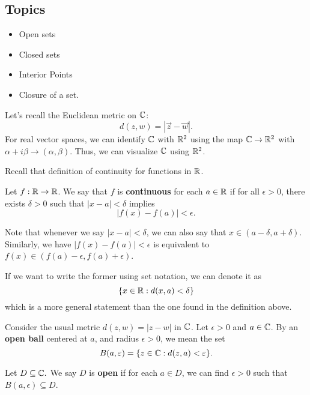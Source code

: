 \documentclass[a4paper]{report}
\begin{document}
    
\rhead{\thepage}
\subsection{Topics}

\begin{itemize}
    \item Open sets
    \item Closed sets
    \item Interior Points
    \item Closure of a set.
\end{itemize}

Let's recall the Euclidean metric on \( \mathbb{C}  \):
\[  d(z,w) = | \vec{ z }  - \vec{ w }   |.  \]
For real vector spaces, we can identify \( \mathbb{C}  \) with \( \mathbb{R}^{2} \) using the map \( \mathbb{C} \to \mathbb{R}^{2}  \) with \( \alpha + i \beta \to (\alpha, \beta) \). Thus, we can visualize \( \mathbb{C}  \) using \( \mathbb{R}^{2} \).

Recall that definition of continuity for functions in \( \R  \).

\begin{definition}[continuity in \( \R  \)]
    Let \( f: \mathbb{R} \to \mathbb{R}  \). We say that \( f  \) is \textbf{continuous} for each \( a \in \mathbb{R}  \) if for all \( \epsilon > 0 \), there exists \( \delta > 0  \) such that \( | x - a  |  < \delta \) implies
    \[  | f(x) - f(a) |  < \epsilon. \]
\end{definition}

Note that whenever we say \( | x - a  |  < \delta  \), we can also say that \( x \in (a - \delta, a + \delta) \). Similarly, we have \( | f(x) - f(a) | < \epsilon  \) is equivalent to \( f(x) \in (f(a) - \epsilon, f(a) + \epsilon) \).

If we want to write the former using set notation, we can denote it as 
\[  \{ x \in \mathbb{R} : d(x,a) < \delta \}  \]
which is a more general statement than the one found in the definition above.
\begin{definition}
  Consider the usual metric \( d(z,w) = | z - w  |   \) in \( \mathbb{C}  \). Let \( \epsilon > 0  \) and \( a \in \mathbb{C}  \). By an \textbf{open ball} centered at \( a  \), and radius \( \epsilon > 0  \), we mean the set
  \[ B(a,\varepsilon)  =  \{ z \in \mathbb{C} : d(z,a) < \varepsilon \}. \]
\end{definition}

\begin{definition}
   Let \( D \subseteq  \mathbb{C} .  \) We say \( D  \) is \textbf{open} if for each \( a \in D  \), we can find \( \epsilon > 0  \) such that  
   \(  B(a,\epsilon) \subseteq D  \).
\end{definition}
\end{document}
